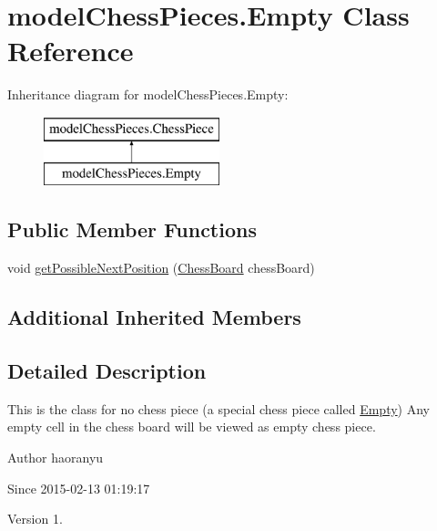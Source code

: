 \hypertarget{classmodel_chess_pieces_1_1_empty}{\section{model\+Chess\+Pieces.\+Empty Class Reference}
\label{classmodel_chess_pieces_1_1_empty}
}
Inheritance diagram for model\+Chess\+Pieces.\+Empty\+:\begin{figure}[H]
\begin{center}
\leavevmode
\includegraphics[height=2.000000cm]{classmodel_chess_pieces_1_1_empty}
\end{center}
\end{figure}
\subsection*{Public Member Functions}
\begin{DoxyCompactItemize}
\item 
void \hyperlink{classmodel_chess_pieces_1_1_empty_ad67a7561ce8e4d8f2f216adf85ab90a1}{get\+Possible\+Next\+Position} (\hyperlink{classmodel_core_1_1_chess_board}{Chess\+Board} chess\+Board)
\end{DoxyCompactItemize}
\subsection*{Additional Inherited Members}


\subsection{Detailed Description}
This is the class for no chess piece (a special chess piece called \hyperlink{classmodel_chess_pieces_1_1_empty}{Empty}) Any empty cell in the chess board will be viewed as empty chess piece. \begin{DoxyAuthor}{Author}
haoranyu 
\end{DoxyAuthor}
\begin{DoxySince}{Since}
2015-\/02-\/13 01\+:19\+:17 
\end{DoxySince}
\begin{DoxyVersion}{Version}
1. 
\end{DoxyVersion}


